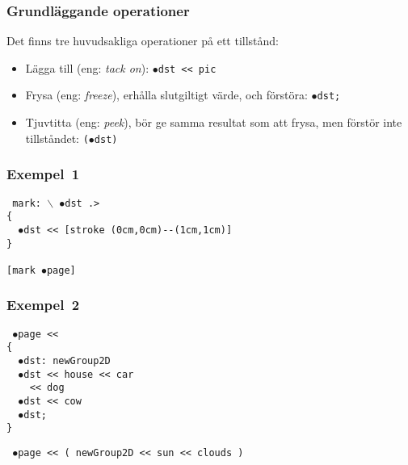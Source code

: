 \documentclass[noamsthm,handout]{beamer}
\newcommand{\inEnglish}[1]{(eng: \emph{#1})}
\begin{document}
\begin{frame}\frametitle{Grundläggande operationer}
  Det finns tre huvudsakliga operationer på ett tillstånd:
  \begin{itemize}
  \item
    Lägga till \inEnglish{tack on}: \texttt{$\bullet$dst {\color{red}<{}<{}} pic}
  \item
    Frysa \inEnglish{freeze}, erhålla slutgiltigt värde, och förstöra: \texttt{$\bullet$dst{\color{red};}}
  \item
    Tjuvtitta \inEnglish{peek}, bör ge samma resultat som att frysa, men förstör inte tillståndet: \texttt{{\color{red}(}$\bullet$dst{\color{red})}}
  \end{itemize}
  
\end{frame}

\begin{frame}\frametitle{Exempel~1}
\texttt{%
mark: $\backslash$ {\color{red}$\bullet$}dst .>\\
\{\\
\ \ {\color{red}$\bullet$}dst {\color{red}<{}<{}} [stroke (0cm,0cm)-{}-(1cm,1cm)]\\
\}\\
\ \\
{}[{}mark {\color{red}$\bullet$}page{}]{}\\
}
\end{frame}

\begin{frame}\frametitle{Exempel~2}
\texttt{%
$\bullet$page <{}<\\
{\color{red}\{}\\
\ \ $\bullet$dst: {\color{red}newGroup2D}\\
\ \ $\bullet$dst <{}<{} house <{}<{} car\\
\ \ \ \ <{}<{} dog\\
\ \ $\bullet$dst <{}<{} cow\\
\ \ $\bullet$dst;\\
{\color{red}\}}
}

\texttt{%
$\bullet$page <{}< {\color{red}(} newGroup2D <{}< sun <{}< clouds {\color{red})}\\
}
\end{frame}
\end{document}
